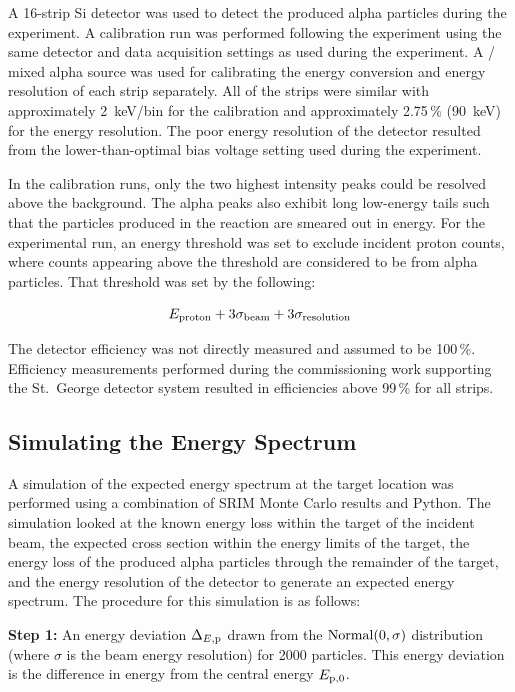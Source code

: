 A 16-strip Si detector was used to detect the produced alpha particles
during the experiment. A calibration run was performed following the
experiment using the same detector and data acquisition settings as used
during the experiment. A / mixed alpha source
was used for calibrating the energy conversion and energy resolution of
each strip separately. All of the strips were similar with approximately
2~keV/bin for the calibration and approximately 2.75\,\% (90~keV) for
the energy resolution. The poor energy resolution of the detector
resulted from the lower-than-optimal bias voltage setting used during
the experiment.

In the calibration runs, only the two highest intensity peaks could be
resolved above the background. The alpha peaks also exhibit long
low-energy tails such that the particles produced in the \alpa{}
reaction are smeared out in energy. For the experimental run, an energy
threshold was set to exclude incident proton counts, where counts
appearing above the threshold are considered to be from alpha particles.
That threshold was set by the following:

\begin{equation}
    E_{\rm proton} + 3 \sigma_{\rm beam} + 3 \sigma_{\rm resolution}
\end{equation}

The detector efficiency was not directly measured and assumed to be
100\,\%. Efficiency measurements performed during the commissioning work
supporting the St.\ George detector system resulted in efficiencies
above 99\,\% for all strips.

\subsection{Simulating the Energy Spectrum}
\label{sec:05-simulating-spectrum}

A simulation of the expected energy spectrum at the target location was
performed using a combination of SRIM Monte Carlo results and Python.
The simulation looked at the known energy loss within the target of the
incident beam, the expected cross section within the energy limits of
the target, the energy loss of the produced alpha particles through the
remainder of the target, and the energy resolution of the detector to
generate an expected energy spectrum. The procedure for this simulation
is as follows:


\textbf{Step 1:}
  An energy deviation $\Delta_{E,{\rm p}}$ drawn from the ${\rm
  Normal}(0,\sigma)$ distribution (where $\sigma$ is the beam energy
  resolution) for 2000 particles. This energy deviation is the
  difference in energy from the central energy $E_{{\rm p},0}$.

